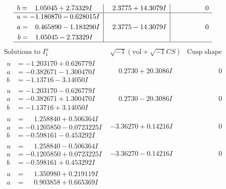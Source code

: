\documentclass[1p]{elsarticle_modified}
\theoremstyle{definition}
\newcommand{\I}{\sqrt{-1}}
\begin{document}
$$\begin{array}{c|c|c}
\begin{aligned}
b &= \phantom{-}1.05045 + 2.73329 I\end{aligned}
 & \phantom{-}2.3775 + 14.3079 I & \phantom{-0.000000 } 0 \\ \hline\begin{aligned}
u &= -1.180870 - 0.628015 I \\
a &= \phantom{-}0.465890 - 1.183290 I \\
b &= \phantom{-}1.05045 - 2.73329 I\end{aligned}
 & \phantom{-}2.3775 - 14.3079 I & \phantom{-0.000000 } 0\\
 \hline 
 \end{array}$$\newpage$$\begin{array}{c|c|c}  
\text{Solutions to }I^u_{1}& \I (\text{vol} + \sqrt{-1}CS) & \text{Cusp shape}\\
 \hline 
\begin{aligned}
u &= -1.203170 + 0.626779 I \\
a &= -0.382671 - 1.300470 I \\
b &= -1.13716 - 3.14050 I\end{aligned}
 & \phantom{-}0.2730 + 20.3086 I & \phantom{-0.000000 } 0 \\ \hline\begin{aligned}
u &= -1.203170 - 0.626779 I \\
a &= -0.382671 + 1.300470 I \\
b &= -1.13716 + 3.14050 I\end{aligned}
 & \phantom{-}0.2730 - 20.3086 I & \phantom{-0.000000 } 0 \\ \hline\begin{aligned}
u &= \phantom{-}1.258840 + 0.506364 I \\
a &= -0.1205850 - 0.0723225 I \\
b &= -0.598161 - 0.453292 I\end{aligned}
 & -3.36270 + 0.14216 I & \phantom{-0.000000 } 0 \\ \hline\begin{aligned}
u &= \phantom{-}1.258840 - 0.506364 I \\
a &= -0.1205850 + 0.0723225 I \\
b &= -0.598161 + 0.453292 I\end{aligned}
 & -3.36270 - 0.14216 I & \phantom{-0.000000 } 0 \\ \hline\begin{aligned}
u &= \phantom{-}1.350980 + 0.219119 I \\
a &= \phantom{-}0.903858 + 0.665369 I \\

\end{aligned}
\end{array}$$
\end{document}
